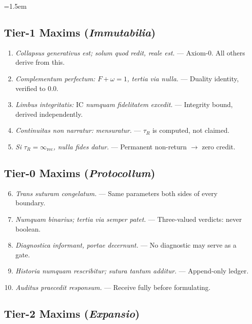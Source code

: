 \documentclass[
  aps,
  prd,
  twocolumn,
  superscriptaddress,
  nofootinbib,
  floatfix
]{revtex4-2}
\newcommand{\tR}{\tau_{\!R}}
\newcommand{\IR}{\infty_{\mathrm{rec}}}
\newcommand{\Fid}{F}
\newcommand{\Drft}{\omega}
\newcommand{\IC}{\mathrm{IC}}
\newcommand{\lat}[1]{\textit{#1}}
\begin{document}
\begin{sloppypar}
\emergencystretch=1.5em

\subsection{Tier-1 Maxims (\lat{Immutabilia})}

\begin{enumerate}[nosep,leftmargin=*]
\item \lat{Collapsus generativus est; solum quod redit, reale
  est.} --- Axiom-0. All others derive from this.
\item \lat{Complementum perfectum: $\Fid + \Drft = 1$, tertia
  via nulla.} --- Duality identity, verified to $0.0$.
\item \lat{Limbus integritatis: $\IC$ numquam fidelitatem
  excedit.} --- Integrity bound, derived independently.
\item \lat{Continuitas non narratur: mensuratur.} ---
  $\tR$ is computed, not claimed.
\item \lat{Si $\tR = \IR$, nulla fides datur.} ---
  Permanent non-return $\to$ zero credit.
\end{enumerate}

\subsection{Tier-0 Maxims (\lat{Protocollum})}

\begin{enumerate}[nosep,leftmargin=*]\setcounter{enumi}{5}
\item \lat{Trans suturam congelatum.} ---
  Same parameters both sides of every boundary.
\item \lat{Numquam binarius; tertia via semper patet.} ---
  Three-valued verdicts: never boolean.
\item \lat{Diagnostica informant, portae decernunt.} ---
  No diagnostic may serve as a gate.
\item \lat{Historia numquam rescribitur; sutura tantum
  additur.} --- Append-only ledger.
\item \lat{Auditus praecedit responsum.} ---
  Receive fully before formulating.
\end{enumerate}

\subsection{Tier-2 Maxims (\lat{Expansio})}


\end{sloppypar}
\end{document}
